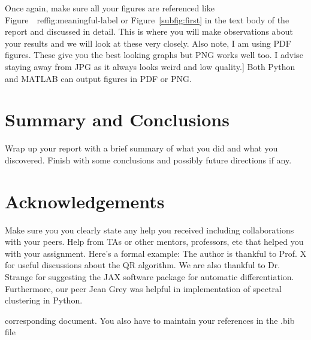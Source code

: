 \documentclass[11pt]{amsart}
\begin{document}
Once again, make sure all your figures are referenced like Figure~\
ref{fig:meaningful-label}
or Figure~\ref{subfig:first} in the text body of the report and discussed
in detail. This is where you will make observations about your results and we will
look at these very closely.
Also note, I am using PDF figures. These give you the best looking graphs but PNG
works
well too. I advise staying away from JPG as it always looks weird and low quality.]
Both Python and MATLAB can output figures in PDF or PNG.
\section{Summary and Conclusions}\label{sec:conclusions}
Wrap up your report with a brief summary of what you did and what you discovered.
Finish with some conclusions and possibly future directions if any.
\section*{Acknowledgements}
Make sure you you clearly state any help you received including collaborations
with your peers. Help from TAs or other mentors, professors, etc that helped you
with your assignment. Here's a formal example:
The author is thankful to Prof. X for useful discussions about the QR algorithm.
We are also thankful to Dr. Strange for suggesting the JAX software package for
automatic differentiation. Furthermore, our peer Jean Grey was helpful in
implementation of spectral clustering in Python.

corresponding document. You also have to maintain your references in the .bib file
\end{document}
